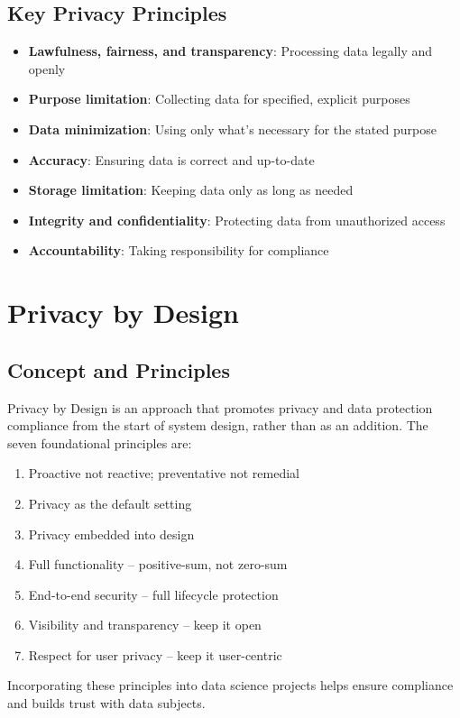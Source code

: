 \documentclass[12pt]{article}
\begin{document}
\subsection{Key Privacy Principles}
\begin{itemize}
    \item \textbf{Lawfulness, fairness, and transparency}: Processing data legally and openly
    \item \textbf{Purpose limitation}: Collecting data for specified, explicit purposes
    \item \textbf{Data minimization}: Using only what's necessary for the stated purpose
    \item \textbf{Accuracy}: Ensuring data is correct and up-to-date
    \item \textbf{Storage limitation}: Keeping data only as long as needed
    \item \textbf{Integrity and confidentiality}: Protecting data from unauthorized access
    \item \textbf{Accountability}: Taking responsibility for compliance
\end{itemize}

\section{Privacy by Design}

\subsection{Concept and Principles}
\begin{tcolorbox}[colback=yellow!5!white,colframe=yellow!75!black,title={Privacy by Design}]
Privacy by Design is an approach that promotes privacy and data protection compliance from the start of system design, rather than as an addition. The seven foundational principles are:

\begin{enumerate}
    \item Proactive not reactive; preventative not remedial
    \item Privacy as the default setting
    \item Privacy embedded into design
    \item Full functionality – positive-sum, not zero-sum
    \item End-to-end security – full lifecycle protection
    \item Visibility and transparency – keep it open
    \item Respect for user privacy – keep it user-centric
\end{enumerate}

Incorporating these principles into data science projects helps ensure compliance and builds trust with data subjects.
\end{tcolorbox}
\end{document}
